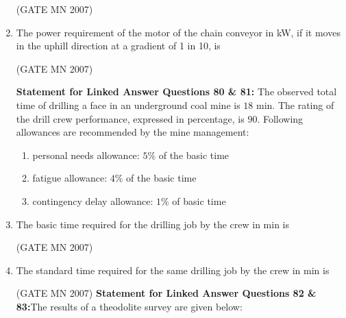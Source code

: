 \documentclass[journal]{IEEEtran}
\begin{document}
\begin{enumerate}
\hfill (GATE MN 2007)

\item The power requirement of the motor of the chain conveyor in kW, if it moves in the uphill direction at a gradient of 1 in 10, is  
\begin{enumerate}
\end{enumerate}
\hfill (GATE MN 2007)

\textbf{Statement for Linked Answer Questions 80 \& 81:} The observed total time of drilling a face in an underground coal mine is $18$ min. The rating of the drill crew performance, expressed in percentage, is $90$.  
Following allowances are recommended by the mine management:
\begin{enumerate}
\item personal needs allowance: $5\%$ of the basic time
\item fatigue allowance: $4\%$ of the basic time
\item contingency delay allowance: $1\%$ of basic time
\end{enumerate}

\item The basic time required for the drilling job by the crew in min is  
\begin{enumerate}
\end{enumerate}
\hfill (GATE MN 2007)

\item The standard time required for the same drilling job by the crew in min is  
\begin{enumerate}
\end{enumerate}
\hfill (GATE MN 2007)
\textbf{Statement for Linked Answer Questions 82 \& 83:}The results of a theodolite survey are given below:  



\end{enumerate}
\end{document}
